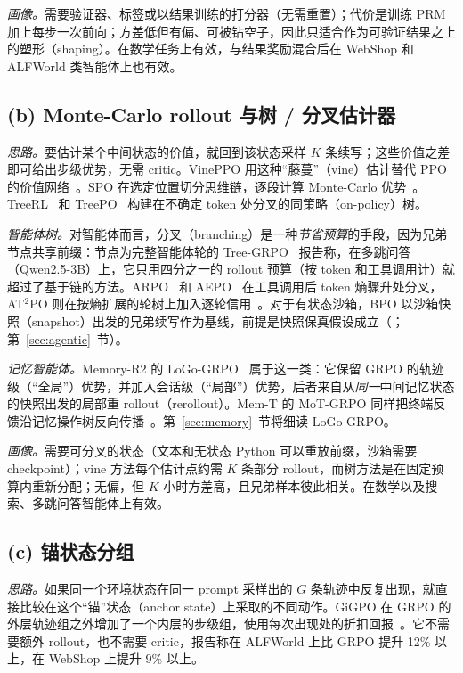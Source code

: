 \emph{画像。}需要验证器、标签或以结果训练的打分器（无需重置）；代价是训练 PRM 加上每步一次前向；方差低但有偏、可被钻空子，因此只适合作为可验证结果之上的塑形（shaping）。在数学任务上有效，与结果奖励混合后在 WebShop 和 ALFWorld 类智能体上也有效。

\subsection{(b) Monte-Carlo rollout 与树 / 分叉估计器}\label{sec:tax-mc}

\emph{思路。}要估计某个中间状态的价值，就回到该状态采样 $K$ 条续写；这些价值之差即可给出步级优势，无需 critic。VinePPO 用这种“藤蔓”（vine）估计替代 PPO 的价值网络~\citep{kazemnejad2024vineppo}\unverified。SPO 在选定位置切分思维链，逐段计算 Monte-Carlo 优势~\citep{guo2025segment}\unverified。TreeRL~\citep{hou2025treerl}\unverified{} 和 TreePO~\citep{li2025treepo}\unverified{} 构建在不确定 token 处分叉的同策略（on-policy）树。

\emph{智能体树。}对智能体而言，分叉（branching）是一种\emph{节省预算}的手段，因为兄弟节点共享前缀：节点为完整智能体轮的 Tree-GRPO~\citep{ji2025tree} 报告称，在多跳问答（Qwen2.5-3B）上，它只用四分之一的 rollout 预算（按 token 和工具调用计）就超过了基于链的方法。ARPO~\citep{dong2025agentic}\unverified{} 和 AEPO~\citep{dong2025agenticentropy}\unverified{} 在工具调用后 token 熵骤升处分叉，AT$^2$PO 则在按熵扩展的轮树上加入逐轮信用~\citep{at2po2026agentic}\unverified。对于有状态沙箱，BPO 以沙箱快照（snapshot）出发的兄弟续写作为基线，前提是快照保真假设成立（\citealp{bpo2026branching}；第~\ref{sec:agentic}~节）。

\emph{记忆智能体。}Memory-R2 的 LoGo-GRPO~\citep{yan2026memory} 属于这一类：它保留 GRPO 的轨迹级（“全局”）优势，并加入会话级（“局部”）优势，后者来自从\emph{同一}中间记忆状态的快照出发的局部重 rollout（rerollout）。Mem-T 的 MoT-GRPO 同样把终端反馈沿记忆操作树反向传播~\citep{memt2026mem}。第~\ref{sec:memory}~节将细读 LoGo-GRPO。

\emph{画像。}需要可分叉的状态（文本和无状态 Python 可以重放前缀，沙箱需要 checkpoint）；vine 方法每个估计点约需 $K$ 条部分 rollout，而树方法是在固定预算内重新分配；无偏，但 $K$ 小时方差高，且兄弟样本彼此相关。在数学以及搜索、多跳问答智能体上有效。

\subsection{(c) 锚状态分组}\label{sec:tax-gigpo}

\emph{思路。}如果同一个环境状态在同一 prompt 采样出的 $G$ 条轨迹中反复出现，就直接比较在这个“锚”状态（anchor state）上采取的不同动作。GiGPO 在 GRPO 的外层轨迹组之外增加了一个内层的步级组，使用每次出现处的折扣回报~\citep{feng2025group}。它不需要额外 rollout，也不需要 critic，报告称在 ALFWorld 上比 GRPO 提升 12\% 以上，在 WebShop 上提升 9\% 以上。

